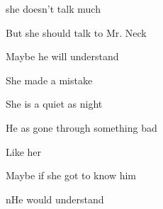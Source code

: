 
she doesn't talk much

\noindent But she should talk to Mr. Neck

\noindent Maybe he will understand

\noindent She made a mistake

\noindent She is a quiet as night

\noindent He as gone through something bad

\noindent Like her

\noindent Maybe if she got to know him

\noindent nHe would understand


